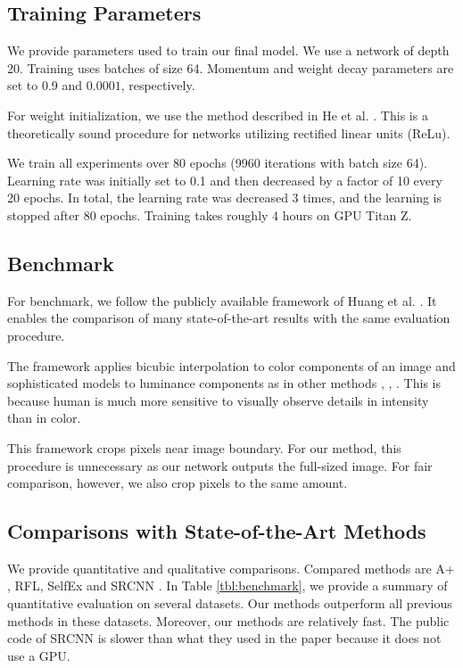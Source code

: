 \documentclass[10pt,twocolumn,letterpaper]{article}
\begin{document}
\subsection{Training Parameters}
We provide parameters used to train our final model. We use a network of depth 20. Training uses batches of size 64. Momentum and weight decay parameters are set to 0.9 and $0.0001$, respectively. 

For weight initialization, we use the method described in He et al. \cite{he2015delving}. This is a theoretically sound procedure for networks utilizing rectified linear units (ReLu).

We train all experiments over 80 epochs (9960 iterations with batch size 64). Learning rate was initially set to 0.1 and then decreased by a factor of 10 every 20 epochs. In total, the learning rate was decreased 3 times, and the learning
is stopped after 80 epochs. Training takes roughly 4 hours on GPU Titan Z. 


\subsection{Benchmark}
For benchmark, we follow the publicly available framework of Huang et al. \cite{Timofte2013}. It enables the comparison of many state-of-the-art results with the same evaluation procedure.

The framework applies bicubic interpolation to color components of an image and sophisticated models to luminance components as in  other methods \cite{chang2004super}, \cite{glasner2009super}, \cite{zeyde2012single}. This is because human is much more sensitive to visually observe details in intensity than in color. 


This framework crops pixels near image boundary. For our method, this procedure is unnecessary as our network outputs the full-sized image. For fair comparison, however, we also crop pixels to the same amount.



\subsection{Comparisons with State-of-the-Art Methods}
We provide quantitative and qualitative comparisons. Compared methods are A+ \cite{Timofte}, RFL\cite{schulter2015fast}, SelfEx \cite{Huang-CVPR-2015} and SRCNN \cite{Dong2014}. In Table \ref{tbl:benchmark}, we provide a summary of quantitative evaluation on several datasets. Our methods outperform all previous methods in these datasets. Moreover, our methods are relatively fast. The public code of SRCNN is slower than what they used in the paper because it does not use a GPU.
\end{document}
